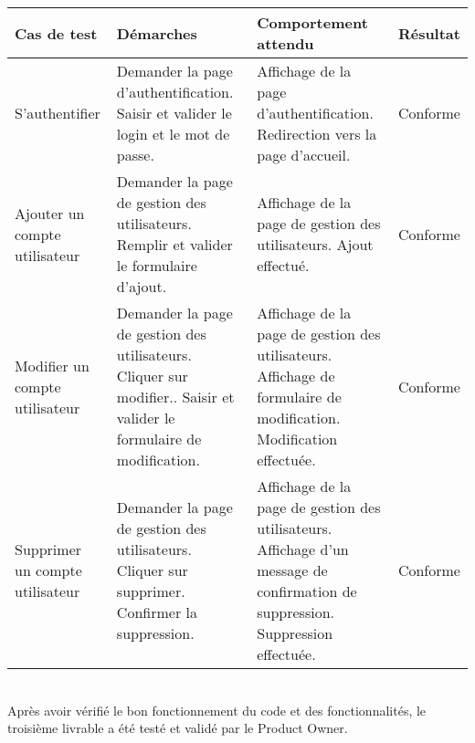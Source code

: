 \begin{tabular}{@{}| >{\raggedright}p{}|>{\raggedright} p{5.1 cm}|>{\raggedright}p{5.2 cm}| >{\centering\arraybackslash}p{}|@{}}
\hline \rowcolor{lightgray} \hspace{1.5pc} \textbf{Cas de test}  & \hspace{1.5pc}  \textbf {Démarches} & \hspace{0.5pc}  \textbf {Comportement attendu} &   \textbf {Résultat} \\

\hline  S’authentifier & Demander la page\newline
d’authentification.\newline
Saisir et valider le login et le mot de
passe.
& Affichage de la page d’authentification.\newline
Redirection vers la page d’accueil.


& Conforme \\

\hline   Ajouter un compte utilisateur & Demander la page de gestion des utilisateurs.\newline
Remplir et valider le formulaire d'ajout.
& Affichage de la page de gestion des utilisateurs.\newline
Ajout effectué.


& Conforme \\

\hline  Modifier un compte utilisateur & Demander la page de gestion des utilisateurs.\newline
Cliquer sur modifier..\newline\newline
Saisir et valider le formulaire
de modification.
& Affichage de la page de gestion des utilisateurs.\newline
Affichage de formulaire de
modification.\newline
Modification effectuée.


& Conforme \\


\hline  Supprimer un compte utilisateur & Demander la page de gestion des utilisateurs.\newline
Cliquer sur supprimer.\newline\newline
Confirmer la suppression.
& Affichage de la page de gestion des utilisateurs.\newline
Affichage d'un message de confirmation de suppression.\newline
Suppression effectuée.


& Conforme \\

\hline

\end{tabular}
\newline
\\
Après avoir vérifié le bon fonctionnement du code et des fonctionnalités, le troisième livrable a été testé et validé par le Product Owner.

